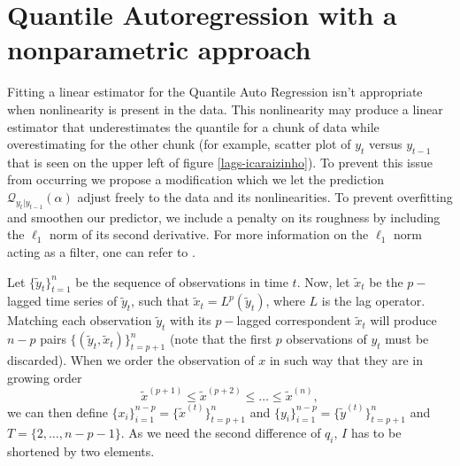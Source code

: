\section{Quantile Autoregression with a nonparametric approach}
\label{sec:npqar}

Fitting a linear estimator for the Quantile Auto Regression isn't appropriate  when nonlinearity is present in the data. This nonlinearity may produce a linear estimator that underestimates the quantile for a chunk of data while overestimating for the other chunk (for example, scatter plot of $y_t$ versus $y_{t-1}$ that is seen on the upper left of figure \ref{lags-icaraizinho}). To prevent this issue from occurring we propose a modification which we let the prediction $\mathcal{Q}_{y_t|y_{t-1}}(\alpha)$ adjust freely to the data and its nonlinearities. To prevent overfitting and smoothen our predictor, we include a penalty on its roughness by including the $\ell_1$ norm of its second derivative. For more information on the $\ell_1$ norm acting as a filter, one can refer to \cite{kim2009ell_1}.




Let $\{\tilde{y}_t \}_{t=1}^n$ be the sequence of observations in time $t$. Now, let $\tilde{x}_t$ be the $p-$lagged time series of $\tilde{y}_t$, such that $\tilde{x}_t = L^p(\tilde{y}_t)$, where $L$ is the lag operator. Matching each observation $\tilde{y}_t$ with its $p-$lagged correspondent $\tilde{x}_t$ will produce $n-p$ pairs $\{(\tilde{y}_t,\tilde{x}_t)\}_{t=p+1}^n$ (note that the first $p$ observations of $y_t$ must be discarded). When we order the observation of $x$ in such way that they are in growing order
$$\tilde{x}^{(p+1)} \leq \tilde{x}^{(p+2)} \leq \dots \leq \tilde{x}^{(n)},$$ 
we can then define $\{x_i\}_{i=1}^{n-p} = \{\tilde{x}^{(t)} \}_{t=p+1}^{n}$ and $\{y_i\}_{i=1}^{n-p} = \{\tilde{y}^{(t)} \}_{t=p+1}^{n}$ and $T = \{2,\dots, n-p-1\}$. As we need the second difference of $q_i$, $I$ has to be shortened by two elements.



